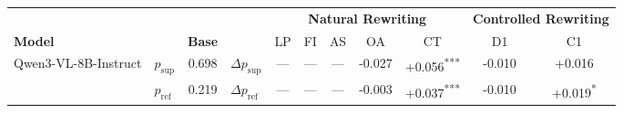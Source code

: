 \begin{tabular}{l l c l ccccccc}
\toprule
 & & & & \multicolumn{5}{c}{\textbf{Natural Rewriting}} & \multicolumn{2}{c}{\textbf{Controlled Rewriting}} \\
\cmidrule(lr){5-9} \cmidrule(lr){10-11}
\textbf{Model} & & \textbf{Base} & & LP & FI & AS & OA & CT & D1 & C1 \\
\midrule
 \multirow{2}{*}{Qwen3-VL-8B-Instruct} & $p_{\text{sup}}$ & 0.698 & $\Delta p_{\text{sup}}$ & — & — & — & \cellcolor{red!10}-0.027 & \cellcolor{green!22}+0.056\textsuperscript{***} & \cellcolor{red!5}-0.010 & \cellcolor{green!6}+0.016 \\
  & $p_{\text{ref}}$ & 0.219 & $\Delta p_{\text{ref}}$ & — & — & — & \cellcolor{red!5}-0.003 & \cellcolor{green!14}+0.037\textsuperscript{***} & \cellcolor{red!5}-0.010 & \cellcolor{green!7}+0.019\textsuperscript{*} \\
\bottomrule
\end{tabular}